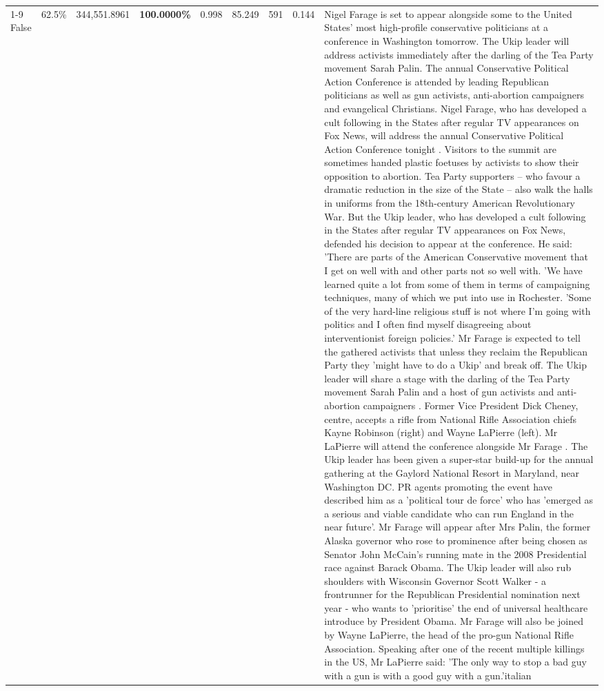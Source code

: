 \begin{table}[H]
\begin{tabular}{lllrlllll}
\cline{1-9} \cline{2-9}
False & 62.5\% & 344,551.8961 & \bfseries \color{red} 100.0000\% & 0.998 & 85.249 & 591 & 0.144 & Nigel Farage is set to appear alongside some to the United States' most high-profile conservative politicians at a conference in Washington tomorrow. The Ukip leader will address activists immediately after the darling of the Tea Party movement Sarah Palin. The annual Conservative Political Action Conference is attended by leading Republican politicians as well as gun activists, anti-abortion campaigners and evangelical Christians. Nigel Farage, who has developed a cult following in the States after regular TV appearances on Fox News, will address the annual Conservative Political Action Conference tonight . Visitors to the summit are sometimes handed plastic foetuses by activists to show their opposition to abortion. Tea Party supporters – who favour a dramatic reduction in the size of the State – also walk the halls in uniforms from the 18th-century American Revolutionary War. But the Ukip leader, who has developed a cult following in the States after regular TV appearances on Fox News, defended his decision to appear at the conference. He said: 'There are parts of the American Conservative movement that I get on well with and other parts not so well with. 'We have learned quite a lot from some of them in terms of campaigning techniques, many of which we put into use in Rochester. 'Some of the very hard-line religious stuff is not where I'm going with politics and I often find myself disagreeing about interventionist foreign policies.' Mr Farage is expected to tell the gathered activists that unless they reclaim the Republican Party they 'might have to do a Ukip' and break off. The Ukip leader will share a stage with the darling of the Tea Party movement Sarah Palin and a host of gun activists and anti-abortion campaigners . Former Vice President Dick Cheney, centre, accepts a rifle from National Rifle Association chiefs Kayne Robinson (right) and Wayne LaPierre (left). Mr LaPierre will attend the conference alongside Mr Farage . The Ukip leader has been given a super-star build-up for the annual gathering at the Gaylord National Resort in Maryland, near Washington DC. PR agents promoting the event have described him as a 'political tour de force' who has 'emerged as a serious and viable candidate who can run England in the near future'. Mr Farage will appear after Mrs Palin, the former Alaska governor who rose to prominence after being chosen as Senator John McCain's running mate in the 2008 Presidential race against Barack Obama. The Ukip leader will also rub shoulders with Wisconsin Governor Scott Walker - a frontrunner for the Republican Presidential nomination next year - who wants to 'prioritise' the end of universal healthcare introduce by President Obama. Mr Farage will also be joined by Wayne LaPierre, the head of the pro-gun National Rifle Association. Speaking after one of the recent multiple killings in the US, Mr LaPierre said: 'The only way to stop a bad guy with a gun is with a good guy with a gun.'italian \\

\end{tabular}
\end{table}
